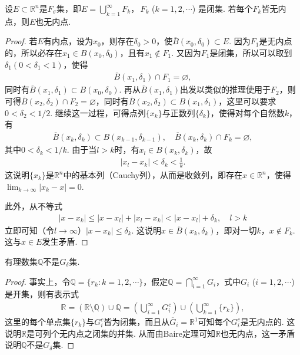 \documentclass[../../main.tex]{subfiles}
\begin{document}
\begin{theorem}[Baire定理]\label{theorem:Baire定理}
设$E\subset\mathbb{R}^n$是$F_{\sigma}$集，即$E = \bigcup_{k = 1}^{\infty}F_k$，$\,F_k$ ($k = 1,2,\cdots$) 是闭集. 若每个$F_k$皆无内点，则$E$也无内点.
\end{theorem}
\begin{proof}
若$E$有内点，设为$x_0$，则存在$\delta_0>0$，使$\overline{B}(x_0,\delta_0)\subset E$. 因为$F_1$是无内点的，所以必存在$x_1\in B(x_0,\delta_0)$，且有$x_1\notin F_1$. 又因为$F_1$是闭集，所以可以取到$\delta_1(0<\delta_1<1)$，使得
\begin{align*}
\overline{B}(x_1,\delta_1)\cap F_1=\varnothing,
\end{align*}
同时有$\overline{B}(x_1,\delta_1)\subset B(x_0,\delta_0)$. 再从$\overline{B}(x_1,\delta_1)$出发以类似的推理使用于$F_2$，则可得$\overline{B}(x_2,\delta_2)\cap F_2=\varnothing$，同时有$\overline{B}(x_2,\delta_2)\subset B(x_1,\delta_1)$，这里可以要求$0<\delta_2<1/2$. 继续这一过程，可得点列$\{x_k\}$与正数列$\{\delta_k\}$，使得对每个自然数$k$，有
\begin{align*}
\overline{B}(x_k,\delta_k)\subset B(x_{k - 1},\delta_{k - 1}), \quad \overline{B}(x_k,\delta_k)\cap F_k=\varnothing,
\end{align*}
其中$0<\delta_k<1/k$. 由于当$l>k$时，有$x_l\in B(x_k,\delta_k)$，故
\begin{align*}
|x_l - x_k|<\delta_k<\frac{1}{k}.
\end{align*}
这说明$\{x_k\}$是$\mathbb{R}^n$中的基本列（Cauchy列），从而是收敛列，即存在$x\in\mathbb{R}^n$，使得$\lim_{k\to\infty}|x_k - x| = 0$.

此外，从不等式
\begin{align*}
|x - x_k|\leqslant|x - x_l|+|x_l - x_k|<|x - x_l|+\delta_k, \quad l>k
\end{align*}
立即可知（令$l\to\infty$）$|x - x_k|\leqslant\delta_k$. 这说明$x\in\overline{B}(x_k,\delta_k)$，即对一切$k$，$x\notin F_k$. 这与$x\in E$发生矛盾. 

\end{proof}

\begin{example}\label{example:例13}
有理数集$\mathbb{Q}$不是$G_{\delta}$集.
\end{example}
\begin{proof}
事实上，令$\mathbb{Q}=\{r_k: k = 1,2,\cdots\}$，假定$\mathbb{Q}=\bigcap_{i = 1}^{\infty}G_i$，式中$G_i$ ($i = 1,2,\cdots$) 是开集，则有表示式
\begin{align*}
\mathbb{R}=(\mathbb{R}\setminus\mathbb{Q})\cup\mathbb{Q}=\left(\bigcup_{i = 1}^{\infty}G_i^c\right)\cup\left(\bigcup_{k = 1}^{\infty}\{r_k\}\right),
\end{align*}
这里的每个单点集$\{r_k\}$与$G_i^c$皆为闭集，而且从$\overline{G}_i=\mathbb{R}^1$可知每个$G_i^c$是无内点的. 这说明$\mathbb{R}$是可列个无内点之闭集的并集. 从而由Baire定理可知$\mathbb{R}$也无内点，这一矛盾说明$\mathbb{Q}$不是$G_{\delta}$集. 

\end{proof}
\end{document}
